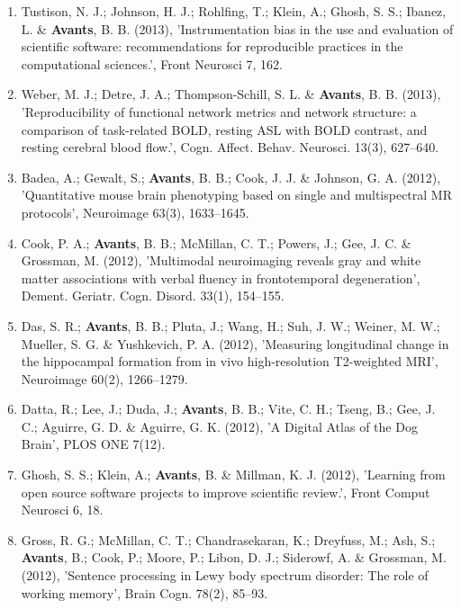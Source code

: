\documentclass[11pt]{moderncv} %
\begin{document}
\begin{enumerate}
\item  Tustison, N. J.; Johnson, H. J.; Rohlfing, T.; Klein, A.; Ghosh, S. S.; Ibanez, L. \&  \textbf{Avants}, B. B. (2013), 'Instrumentation bias in the use and evaluation of scientific software: recommendations for reproducible practices in the computational sciences.', Front Neurosci 7, 162.

\item  Weber, M. J.; Detre, J. A.; Thompson-Schill, S. L. \&  \textbf{Avants}, B. B. (2013), 'Reproducibility of functional network metrics and network structure: a comparison of task-related BOLD, resting ASL with BOLD contrast, and resting cerebral blood flow.', Cogn. Affect. Behav. Neurosci. 13(3), 627--640.

\item  Badea, A.; Gewalt, S.; \textbf{Avants}, B. B.; Cook, J. J. \&  Johnson, G. A. (2012), 'Quantitative mouse brain phenotyping based on single and multispectral MR protocols', Neuroimage 63(3), 1633--1645.

\item  Cook, P. A.; \textbf{Avants}, B. B.; McMillan, C. T.; Powers, J.; Gee, J. C. \&  Grossman, M. (2012), 'Multimodal neuroimaging reveals gray and white matter associations with verbal fluency in frontotemporal degeneration', Dement. Geriatr. Cogn. Disord. 33(1), 154--155.

\item  Das, S. R.; \textbf{Avants}, B. B.; Pluta, J.; Wang, H.; Suh, J. W.; Weiner, M. W.; Mueller, S. G. \&  Yushkevich, P. A. (2012), 'Measuring longitudinal change in the hippocampal formation from in vivo high-resolution T2-weighted MRI', Neuroimage 60(2), 1266--1279.

\item  Datta, R.; Lee, J.; Duda, J.; \textbf{Avants}, B. B.; Vite, C. H.; Tseng, B.; Gee, J. C.; Aguirre, G. D. \&  Aguirre, G. K. (2012), 'A Digital Atlas of the Dog Brain', PLOS ONE 7(12).

\item  Ghosh, S. S.; Klein, A.; \textbf{Avants}, B. \&  Millman, K. J. (2012), 'Learning from open source software projects to improve scientific review.', Front Comput Neurosci 6, 18.

\item  Gross, R. G.; McMillan, C. T.; Chandrasekaran, K.; Dreyfuss, M.; Ash, S.; \textbf{Avants}, B.; Cook, P.; Moore, P.; Libon, D. J.; Siderowf, A. \&  Grossman, M. (2012), 'Sentence processing in Lewy body spectrum disorder: The role of working memory', Brain Cogn. 78(2), 85--93.


\end{enumerate}
\end{document}
